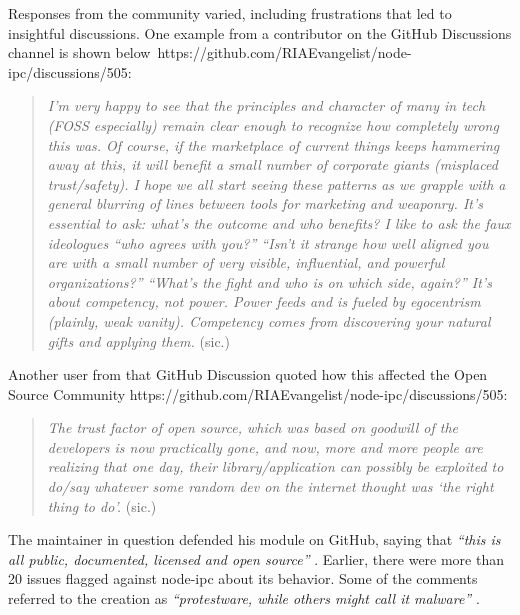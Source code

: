 \documentclass[journal,twocolumn]{IEEEtran}
\begin{document}
 Responses from the community varied, including frustrations that led to insightful discussions.
One example from a contributor on the GitHub Discussions channel is shown below~https://github.com/RIAEvangelist/node-ipc/discussions/505:
\begin{quote}
\textit{I'm very happy to see that the principles and character of many in tech (FOSS especially) remain clear enough to recognize how completely wrong this was. Of course, if the marketplace of current things keeps hammering away at this, it will benefit a small number of corporate giants (misplaced trust/safety). I hope we all start seeing these patterns as we grapple with a general blurring of lines between tools for marketing and weaponry.
It's essential to ask: what's the outcome and who benefits? I like to ask the faux ideologues ``who agrees with you?'' ``Isn't it strange how well aligned you are with a small number of very visible, influential, and powerful organizations?'' ``What's the fight and who is on which side, again?''
It's about competency, not power. Power feeds and is fueled by egocentrism (plainly, weak vanity). Competency comes from discovering your natural gifts and applying them.} (sic.)
\end{quote}

Another user from that GitHub Discussion quoted how this affected the Open Source Community https://github.com/RIAEvangelist/node-ipc/discussions/505:
\begin{quote}
 \textit{The trust factor of open source, which was based on goodwill of the developers is now practically gone, and now, more and more people are realizing that one day, their library/application can possibly be exploited to do/say whatever some random dev on the internet thought was `the right thing to do'.} (sic.)
\end{quote}
The maintainer in question defended his module on GitHub, saying that \textit{``this is all public, documented, licensed and open source''} \cite{kula2022war}. Earlier, there were more than 20 issues flagged against node-ipc about its behavior.
Some of the comments referred to the creation as \textit{``protestware, while others might call it malware''}  \cite{kula2022war}. 
\end{document}
